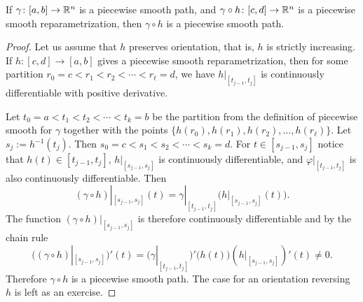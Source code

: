 
\begin{prop} \label{prop:reparamapiecewisesmooth}
If $\gamma \colon [a,b] \to {\mathbb{R}}^n$ is a piecewise smooth path,
and $\gamma \circ h \colon [c,d] \to {\mathbb{R}}^n$ is
a piecewise smooth reparametrization, then $\gamma \circ h$
is a piecewise smooth path.
\end{prop}

\begin{proof}
Let us assume that $h$ preserves orientation, that is, $h$ is strictly
increasing.
If $h \colon [c,d] \to [a,b]$ gives a piecewise smooth reparametrization,
then for some partition
$r_0 = c < r_1 < r_2 < \cdots < r_\ell = d$, we have
$h|_{[t_{j-1},t_j]}$ is continuously differentiable with positive
derivative.


Let $t_0 = a < t_1 < t_2 < \cdots < t_k = b$ be the partition from the
definition of piecewise smooth for $\gamma$ together with the 
points $\{ h(r_0), h(r_1), h(r_2), \ldots, h(r_\ell) \}$.
Let $s_j := h^{-1}(t_j)$.  Then
$s_0 = c < s_1 < s_2 < \cdots < s_k = d$.
For $t \in [s_{j-1},s_j]$ notice that $h(t) \in [t_{j-1},t_j]$,
$h|_{[s_{j-1},s_j]}$ is continuously differentiable, and
$\varphi|_{[t_{j-1},t_j]}$ is also continuously differentiable.
Then
\begin{equation*}
(\gamma \circ h)|_{[s_{j-1},s_{j}]} (t)
=
\gamma|_{[t_{j-1},t_{j}]} \bigl( h|_{[s_{j-1},s_j]}(t) \bigr) .
\end{equation*}
The function 
$(\gamma \circ h)|_{[s_{j-1},s_{j}]}$ is therefore continuously
differentiable and
by the chain rule
\begin{equation*}
\bigl( (\gamma \circ h)|_{[s_{j-1},s_{j}]} \bigr) ' (t)
=
\bigl( \gamma|_{[t_{j-1},t_{j}]} \bigr)' \bigl( h(t) \bigr)
(h|_{[s_{j-1},s_j]})'(t) \not= 0 .
\end{equation*}
Therefore $\gamma \circ h$ is a piecewise smooth path.  The case for an
orientation reversing $h$ is left as an exercise.
\end{proof}

